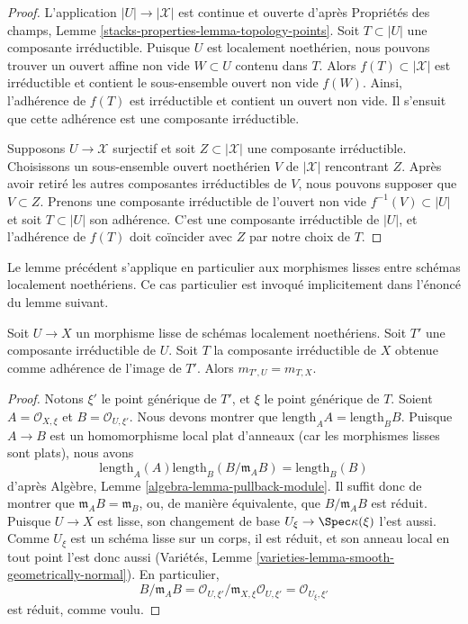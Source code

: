 \begin{proof}
L'application $|U| \to |\mathcal{X}|$ est continue et ouverte d'après
Propriétés des champs, Lemme \ref{stacks-properties-lemma-topology-points}.
Soit $T \subset |U|$ une composante irréductible. Puisque $U$ est localement
noethérien, nous pouvons trouver un ouvert affine non vide $W \subset U$ contenu dans $T$.
Alors $f(T) \subset |\mathcal{X}|$ est irréductible et contient le
sous-ensemble ouvert non vide $f(W)$. Ainsi, l'adhérence de $f(T)$ est irréductible et
contient un ouvert non vide. Il s'ensuit que cette adhérence est une composante
irréductible.

\medskip\noindent
Supposons $U \to \mathcal{X}$ surjectif et soit $Z \subset |\mathcal{X}|$
une composante irréductible. Choisissons un sous-ensemble ouvert noethérien $V$
de $|\mathcal{X}|$ rencontrant $Z$. Après avoir retiré les autres composantes
irréductibles de $V$, nous pouvons supposer que $V \subset Z$.
Prenons une composante irréductible de l'ouvert non vide
$f^{-1}(V) \subset |U|$ et soit $T \subset |U|$ son adhérence.
C'est une composante irréductible de $|U|$, et l'adhérence de $f(T)$
doit coïncider avec $Z$ par notre choix de $T$.
\end{proof}

\noindent
Le lemme précédent s'applique en particulier aux morphismes lisses
entre schémas localement noethériens. Ce cas particulier est
invoqué implicitement dans l'énoncé du lemme suivant.

\begin{lemma}
\label{lemma-multiplicities}
Soit $U \to X$ un morphisme lisse de schémas localement noethériens.
Soit $T'$ une composante irréductible de $U$. Soit $T$ la
composante irréductible de $X$ obtenue comme adhérence de
l'image de $T'$. Alors $m_{T', U} = m_{T, X}$.
\end{lemma}

\begin{proof}
Notons $\xi'$ le point générique de $T'$, et $\xi$ le
point générique de $T$. Soient $A = \mathcal{O}_{X, \xi}$ et
$B = \mathcal{O}_{U, \xi'}$. Nous devons montrer que
$\text{length}_A A = \text{length}_B B$. Puisque
$A \to B$ est un homomorphisme local plat d'anneaux
(car les morphismes lisses sont plats), nous avons
$$
\text{length}_A(A) \text{length}_B(B/\mathfrak m_A B) =
\text{length}_B(B)
$$
d'après Algèbre, Lemme \ref{algebra-lemma-pullback-module}. Il suffit donc
de montrer que $\mathfrak m_A B = \mathfrak m_B$, ou, de manière équivalente, que
$B/\mathfrak m_A B$ est réduit. Puisque $U \to X$ est lisse,
son changement de base $U_{\xi} \to \Spec \kappa(\xi)$ l'est aussi. Comme $U_{\xi}$ est un
schéma lisse sur un corps, il est réduit, et son anneau local
en tout point l'est donc aussi
(Variétés, Lemme \ref{varieties-lemma-smooth-geometrically-normal}).
En particulier,
$$
B/\mathfrak m_A B =
\mathcal{O}_{U, \xi'}/\mathfrak m_{X, \xi}\mathcal{O}_{U, \xi'} =
\mathcal{O}_{U_\xi, \xi'}
$$
est réduit, comme voulu.
\end{proof}

